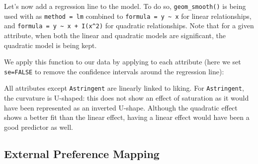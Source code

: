 \documentclass[
]{book}
\newenvironment{Shaded}{\begin{snugshade}}{\end{snugshade}}
\newcommand{\AttributeTok}[1]{\textcolor[rgb]{0.77,0.63,0.00}{#1}}
\newcommand{\ConstantTok}[1]{\textcolor[rgb]{0.00,0.00,0.00}{#1}}
\newcommand{\ControlFlowTok}[1]{\textcolor[rgb]{0.13,0.29,0.53}{\textbf{#1}}}
\newcommand{\FunctionTok}[1]{\textcolor[rgb]{0.00,0.00,0.00}{#1}}
\newcommand{\NormalTok}[1]{#1}
\newcommand{\OtherTok}[1]{\textcolor[rgb]{0.56,0.35,0.01}{#1}}
\newcommand{\SpecialCharTok}[1]{\textcolor[rgb]{0.00,0.00,0.00}{#1}}
\newcommand{\StringTok}[1]{\textcolor[rgb]{0.31,0.60,0.02}{#1}}
\begin{document}
Let's now add a regression line to the model. To do so, \texttt{geom\_smooth()} is being used with as \texttt{method\ =\ lm} combined to \texttt{formula\ =\ \textquotesingle{}y\ \textasciitilde{}\ x\textquotesingle{}} for linear relationships, and \texttt{formula\ =\ \textquotesingle{}y\ \textasciitilde{}\ x\ +\ I(x\^{}2)\textquotesingle{}} for quadratic relationships. Note that for a given attribute, when both the linear and quadratic models are significant, the quadratic model is being kept.

\begin{Shaded}
\end{Shaded}

We apply this function to our data by applying to each attribute (here we set \texttt{se=FALSE} to remove the confidence intervals around the regression line):

\begin{Shaded}
\end{Shaded}

All attributes except \texttt{Astringent} are linearly linked to liking.
For \texttt{Astringent}, the curvature is U-shaped: this does not show an effect of saturation as it would have been represented as an inverted U-shape. Although the quadratic effect shows a better fit than the linear effect, having a linear effect would have been a good predictor as well.

\hypertarget{external-preference-mapping}{%
\subsection{External Preference Mapping}\label{external-preference-mapping}}
\end{document}
